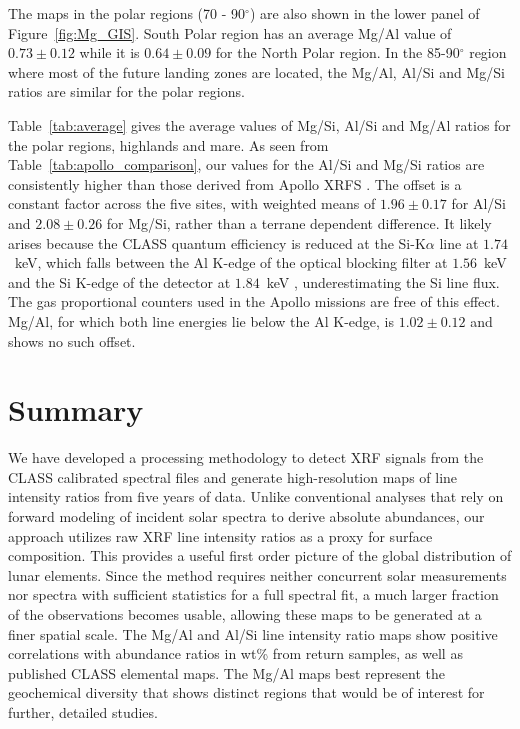 \documentclass[twocolumn,linenumbers]{aastex631}
\newcommand{\revone}[1]{#1}
\newcommand{\revtwo}[1]{#1}
\begin{document}
The maps in the polar regions (70 - 90$^\circ$) are also shown in the lower panel of Figure~\ref{fig:Mg_GIS}.  South Polar region has an average Mg/Al value of $0.73 \pm 0.12$ while it is $0.64 \pm 0.09$ for the North Polar region. In the 85-90$^\circ$ region where most of the future landing zones are located, the Mg/Al, Al/Si and Mg/Si ratios are similar for the polar regions. 

Table~\ref{tab:average} gives the average values of Mg/Si, Al/Si and Mg/Al ratios for the polar regions, highlands and mare. \revone{As seen from Table~\ref{tab:apollo_comparison}, our values for the Al/Si and Mg/Si ratios are consistently higher than those derived from Apollo XRFS \citep{Gloudermans2021}.} \revtwo{The offset is a constant factor across the five sites, with weighted means of $1.96 \pm 0.17$ for Al/Si and $2.08 \pm 0.26$ for Mg/Si, rather than a terrane dependent difference. It likely arises because the CLASS quantum efficiency is reduced at the Si-K$\alpha$ line at $1.74$~keV, which falls between the Al K-edge of the optical blocking filter at $1.56$~keV and the Si K-edge of the detector at $1.84$~keV \citep[Figure~8]{PILLAI2021114436}, underestimating the Si line flux.} \revtwo{The gas proportional counters used in the Apollo missions are free of this effect.} \revtwo{Mg/Al, for which both line energies lie below the Al K-edge, is $1.02 \pm 0.12$ and shows no such offset.}

  




\section{Summary}
We have developed a processing methodology to detect XRF signals from the CLASS calibrated spectral files and generate high-resolution maps of line intensity ratios \revtwo{from five years of data}. \revone{Unlike conventional analyses that rely on forward modeling of incident solar spectra to derive absolute abundances, our approach utilizes raw XRF line intensity ratios as a proxy for surface composition.} \revtwo{This provides a useful first order picture of the global distribution of lunar elements. Since the method requires neither concurrent solar measurements nor spectra with sufficient statistics for a full spectral fit, a much larger fraction of the observations becomes usable, allowing these maps to be generated at a finer spatial scale.} The Mg/Al and Al/Si line intensity ratio \revone{maps show positive correlations} with abundance ratios in wt\% from return samples, as well as published CLASS elemental maps. The Mg/Al maps best represent the geochemical diversity that shows distinct regions that would be of interest for further, detailed studies.
\end{document}
